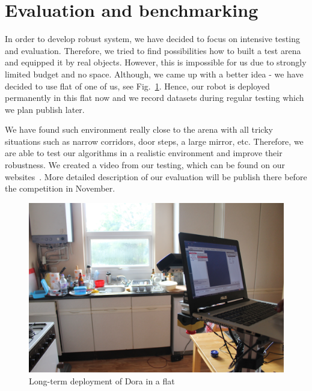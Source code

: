 \section{Evaluation and benchmarking}

In order to develop robust system, we have decided to focus on intensive testing and evaluation. 
Therefore, we tried to find possibilities how to built a test arena and equipped it by real objects.
However, this is impossible for us due to strongly limited budget and no space. 
Although, we came up with a better idea - we have decided to use flat of one of us, see Fig.~\ref{fig:kitchen}.
Hence, our robot is deployed permanently in this flat now and we record datasets during regular testing which we plan publish later. 

We have found such environment really close to the arena with all tricky situations such as narrow corridors, door steps, a large mirror, etc. 
Therefore, we are able to test our algorithms in a realistic environment and improve their robustness.
We created a video from our testing, which can be found on our websites~\cite{barc_web}. More detailed description of our evaluation will be publish there before the competition in November.

\begin{figure}[ht!b]
\centering
\includegraphics[width=3.in]{kitchen.JPG}
\caption{Long-term deployment of Dora in a flat}
\label{fig:kitchen}
\end{figure}  